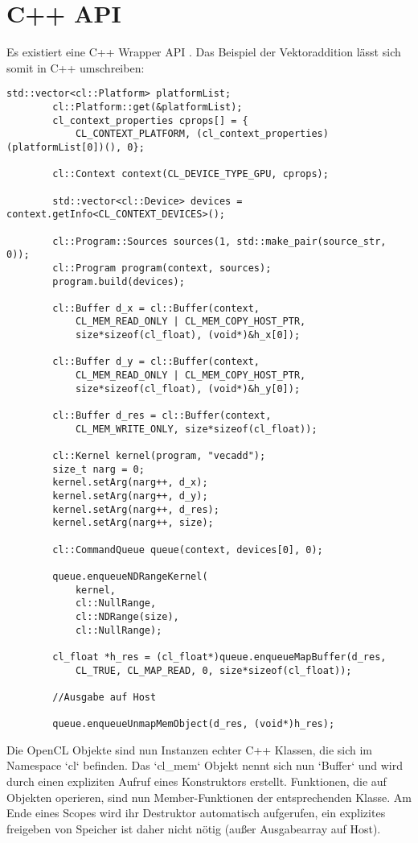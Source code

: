 		\section{C++ API}
		Es existiert eine C++ Wrapper \Gls{API} \autocite{oclC++API}.  Das Beispiel der Vektoraddition lässt sich somit in C++ umschreiben:
		\begin{lstlisting}[caption=~OpenCL C++ API]
		std::vector<cl::Platform> platformList;
		cl::Platform::get(&platformList);
		cl_context_properties cprops[] = {
			CL_CONTEXT_PLATFORM, (cl_context_properties)(platformList[0])(), 0};
    
		cl::Context context(CL_DEVICE_TYPE_GPU, cprops);

		std::vector<cl::Device> devices = context.getInfo<CL_CONTEXT_DEVICES>();

		cl::Program::Sources sources(1, std::make_pair(source_str, 0));
		cl::Program program(context, sources);
		program.build(devices);

		cl::Buffer d_x = cl::Buffer(context, 
			CL_MEM_READ_ONLY | CL_MEM_COPY_HOST_PTR, 
			size*sizeof(cl_float), (void*)&h_x[0]);

		cl::Buffer d_y = cl::Buffer(context, 
			CL_MEM_READ_ONLY | CL_MEM_COPY_HOST_PTR, 
			size*sizeof(cl_float), (void*)&h_y[0]);

		cl::Buffer d_res = cl::Buffer(context, 
			CL_MEM_WRITE_ONLY, size*sizeof(cl_float));

		cl::Kernel kernel(program, "vecadd");
		size_t narg = 0;
		kernel.setArg(narg++, d_x);
		kernel.setArg(narg++, d_y);
		kernel.setArg(narg++, d_res);
		kernel.setArg(narg++, size);
    
		cl::CommandQueue queue(context, devices[0], 0);

		queue.enqueueNDRangeKernel(
			kernel, 
			cl::NullRange, 
			cl::NDRange(size), 
			cl::NullRange);
 
		cl_float *h_res = (cl_float*)queue.enqueueMapBuffer(d_res,
			CL_TRUE, CL_MAP_READ, 0, size*sizeof(cl_float));

		//Ausgabe auf Host
		
		queue.enqueueUnmapMemObject(d_res, (void*)h_res);
		\end{lstlisting}
		Die OpenCL Objekte sind nun Instanzen echter C++ Klassen, die sich im Namespace \li`cl` befinden. Das \li`cl_mem` Objekt nennt sich nun \li`Buffer` und wird durch einen expliziten Aufruf eines Konstruktors erstellt. Funktionen, die auf Objekten operieren, sind nun Member-Funktionen der entsprechenden Klasse. Am Ende eines Scopes wird ihr Destruktor automatisch aufgerufen, ein explizites freigeben von Speicher ist daher nicht nötig (außer Ausgabearray auf Host).
		
